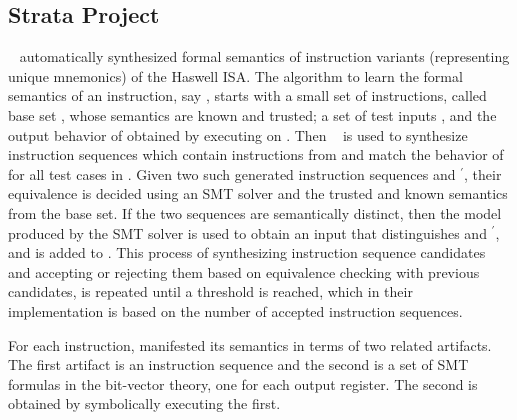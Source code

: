 \subsection{Strata Project}\label{sec:prelimstrata}
\Strata~\cite{Heule2016a} automatically synthesized formal semantics of \strataWithDupIS{} instruction variants (representing \strataIntel{} unique mnemonics) of the \ISA Haswell ISA. 
The algorithm to learn the formal semantics of an instruction, say , starts with a small set of instructions, called base set , whose semantics are known and trusted; a set of test inputs , and the output behavior of  obtained by executing  on . Then \Stoke~\cite{Stoke2013} is used  to synthesize  instruction sequences which contain instructions from  and match the behavior of  for all test cases in . Given two such generated instruction sequences  and $^\prime$, their equivalence is decided  using an SMT solver and the trusted and known  semantics from the base set. If the two sequences are
semantically distinct, then the model produced by the SMT solver is used  to obtain
an input  that distinguishes  and $^\prime$, and  is added to . This process of synthesizing instruction sequence candidates and accepting or rejecting them based on equivalence checking with previous candidates, is repeated until a threshold is reached, which in their implementation is based on the number of accepted instruction sequences. 


For each instruction, \Strata manifested its semantics in terms of two related artifacts.
The first artifact is an instruction sequence and the second is a set of SMT formulas 
in the bit-vector theory, one for each output register. 
The second is obtained by symbolically executing the first.

